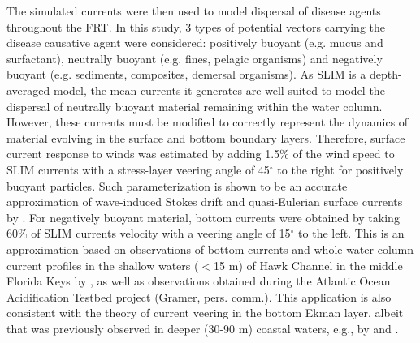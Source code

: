 The simulated currents were then used to model dispersal of disease agents throughout the FRT. In this study, 3 types of potential vectors carrying the disease causative agent were considered: positively buoyant (e.g. mucus and surfactant), neutrally buoyant (e.g. fines, pelagic organisms) and negatively buoyant (e.g. sediments, composites, demersal organisms). As SLIM is a depth-averaged model, the mean currents it generates are well suited to model the dispersal of neutrally buoyant material remaining within the water column. However, these currents must be modified to correctly represent the dynamics of material evolving in the surface and bottom boundary layers. Therefore, surface current response to winds was estimated by adding 1.5\% of the wind speed to SLIM currents with a stress-layer veering angle of 45$^\circ$ to the right for positively buoyant particles. Such parameterization is shown to be an accurate approximation of wave-induced Stokes drift and quasi-Eulerian surface currents by \cite{ardhuin2009observation}. For negatively buoyant material, bottom currents were obtained by taking 60\% of SLIM currents velocity with a veering angle of 15$^\circ$ to the left. This is an approximation based on observations of bottom currents and whole water column current profiles in the shallow waters ($<$15 m) of Hawk Channel in the middle Florida Keys by \cite{smith2009influence}, as well as observations obtained during the Atlantic Ocean Acidification Testbed project (Gramer, pers. comm.). This application is also consistent with the theory of current veering in the bottom Ekman layer, albeit that was previously observed in deeper (30-90 m) coastal waters, e.g., by \cite{perlin2007organization} and \cite{kundu1976ekman}.

